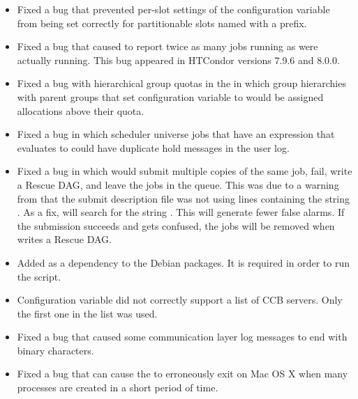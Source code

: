 \begin{itemize}

\item Fixed a bug that prevented per-slot settings of the 
 configuration variable from being set
correctly for partitionable slots named with a  prefix.

\item Fixed a bug that caused   to report twice
as many jobs running as were actually running. 
This bug appeared in HTCondor versions 7.9.6 and 8.0.0.

\item Fixed a bug with hierarchical group quotas in the 
in which group hierarchies with parent groups that set 
configuration variable  to
 would be assigned allocations above their quota.

\item Fixed a bug in which scheduler universe jobs that
have an 
expression that evaluates to  could have duplicate hold messages
in the user log.

\item Fixed a bug in which  would submit multiple copies of the
same job, fail, write a Rescue DAG, and leave the jobs in the queue. 
This was due to a warning from  that the submit description file
was not using lines containing the string . 
As a fix,  will search for the
string .
This will generate fewer false alarms. 
If the submission succeeds and  gets confused, 
the jobs will be removed when  writes a Rescue DAG.

\item Added  as a dependency to the Debian packages.
It is required in order to run the  script.

\item Configuration variable  did not correctly 
support a list of CCB servers.  Only the first one in the list was used.

\item Fixed a bug that caused some communication layer log messages 
to end with binary characters.

\item Fixed a bug that can cause the  to erroneously exit
on Mac OS X when many processes are created in a short period of time.


\end{itemize}
